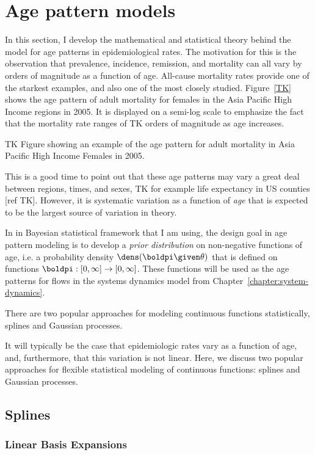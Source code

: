 \section{Age pattern models}
\label{theory-age_pattern_model}
In this section, I develop the mathematical and statistical theory behind the 
model for age patterns in epidemiological rates.  The motivation for
this is the observation that prevalence, incidence, remission, and
mortality can all vary by orders of magnitude as a function of age.
All-cause mortality rates provide one of the starkest examples, and
also one of the most closely studied.  Figure~\ref{TK} shows the age
pattern of adult mortality for females in the Asia Pacific High Income
regions in 2005.  It is displayed on a semi-log scale to emphasize the
fact that the mortality rate ranges of TK orders of magnitude as age
increases.

TK Figure showing an example of the age pattern
for adult mortality in Asia Pacific High Income Females in 2005.

This
is a good time to point out that these age patterns may vary a great
deal between regions, times, and sexes, TK for example life expectancy
in US counties [ref TK].  However, it is systematic variation as a
function of \emph{age} that is expected to be the largest source of
variation in theory.

In in Bayesian statistical framework that I am using, the design goal
in age pattern modeling is to develop a \emph{prior distribution} on
non-negative functions of age, i.e. a probability density
$\dens(\boldpi\given\theta)$ that is defined on functions
$\boldpi:[0,\infty]\rightarrow[0,\infty]$.  These functions will be used as
the age patterns for flows in the systems dynamics model from
Chapter~\ref{chapter:system-dynamics}.

There are two popular approaches for modeling continuous functions
statistically, splines and Gaussian processes.


It will typically be the case that epidemiologic rates vary as a function of age, and, furthermore, that this variation is not linear. Here, we discuss two popular approaches for flexible statistical modeling of continuous functions: splines and Gaussian processes. 

\subsection{Splines}

\subsubsection{Linear Basis Expansions}

